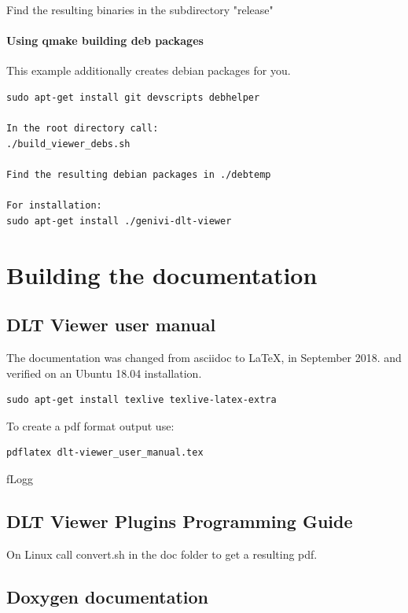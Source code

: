 \documentclass[a4paper,11pt]{article}
\begin{document}
Find the resulting binaries in the subdirectory "release"


\paragraph{Using qmake building deb packages}

This example additionally creates debian packages for you.\linebreak
\begin{verbatim}
sudo apt-get install git devscripts debhelper

In the root directory call:
./build_viewer_debs.sh

Find the resulting debian packages in ./debtemp

For installation:
sudo apt-get install ./genivi-dlt-viewer
\end{verbatim}

\pagebreak

\section{Building the documentation}

\subsection{DLT Viewer user manual}

The documentation was changed from asciidoc to  \LaTeX, in September 2018.\linebreak
and verified on an Ubuntu 18.04 installation.

\begin{verbatim}
sudo apt-get install texlive texlive-latex-extra
\end{verbatim}

To create a pdf format output use:
\begin{verbatim}
pdflatex dlt-viewer_user_manual.tex
\end{verbatim}fLogg

\subsection{DLT Viewer Plugins Programming Guide}

On Linux call convert.sh in the doc folder to get a resulting pdf.

\subsection{Doxygen documentation}
\end{document}
